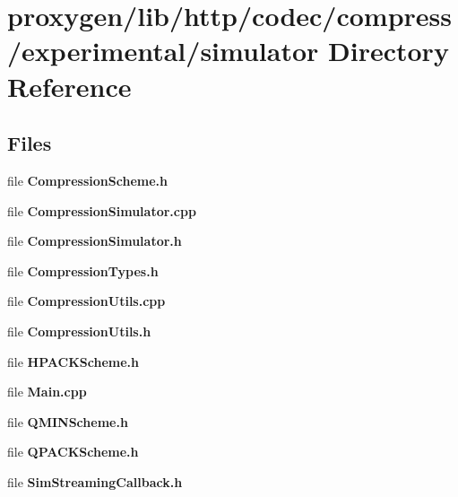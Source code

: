\section{proxygen/lib/http/codec/compress/experimental/simulator Directory Reference}
\label{dir_bae065f780e12528891a1684866ce1ab}
\subsection*{Files}
\begin{DoxyCompactItemize}
\item 
file {\bf Compression\+Scheme.\+h}
\item 
file {\bf Compression\+Simulator.\+cpp}
\item 
file {\bf Compression\+Simulator.\+h}
\item 
file {\bf Compression\+Types.\+h}
\item 
file {\bf Compression\+Utils.\+cpp}
\item 
file {\bf Compression\+Utils.\+h}
\item 
file {\bf H\+P\+A\+C\+K\+Scheme.\+h}
\item 
file {\bf Main.\+cpp}
\item 
file {\bf Q\+M\+I\+N\+Scheme.\+h}
\item 
file {\bf Q\+P\+A\+C\+K\+Scheme.\+h}
\item 
file {\bf Sim\+Streaming\+Callback.\+h}
\end{DoxyCompactItemize}
